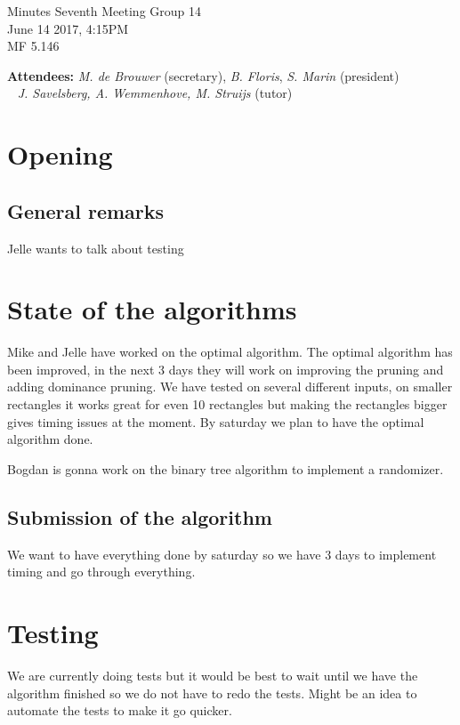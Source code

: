 \documentclass[a4paper,twoside,11pt]{article}
\title{}
\date{}
\begin{document}

\begin{center}
	\Huge{Minutes Seventh Meeting Group 14}
	\\\vspace*{2mm}
	\Large{June 14 2017, 4:15PM}
	\\\vspace*{2mm}
	\large{MF 5.146}
	\\
\end{center}

\textbf{Attendees:} \textit{M. de Brouwer} (secretary),
\textit{B. Floris}, \textit{S. Marin} (president)
\\\indent\qquad\,\,\,\,\,\qquad\quad \textit{J. Savelsberg, A. Wemmenhove, M. Struijs} (tutor)

\section{Opening}
\subsection{General remarks}
Jelle wants to talk about testing

\section{State of the algorithms}
Mike and Jelle have worked on the optimal algorithm. The optimal algorithm has been improved, in the next 3 days they will work on improving the pruning and adding dominance pruning. We have tested on several different inputs, on smaller rectangles it works great for even 10 rectangles but making the rectangles bigger gives timing issues at the moment. By saturday we plan to have the optimal algorithm done. 

\noindent Bogdan is gonna work on the binary tree algorithm to implement a randomizer.
\subsection{Submission of the algorithm}
We want to have everything done by saturday so we have 3 days to implement timing and go through everything. 

\section{Testing}
We are currently doing tests but it would be best to wait until we have the algorithm finished so we do not have to redo the tests. Might be an idea to automate the tests to make it go quicker. 
\end{document}
